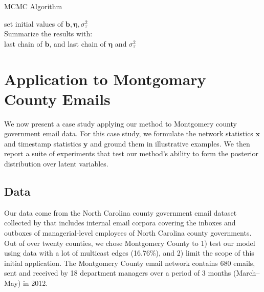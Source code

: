 \documentclass[12pt]{article}
\begin{document}
 \begin{algorithm}[H]
 	\SetAlgoLined
 	\caption{MCMC Algorithm}
 	set initial values of $\boldsymbol{b}, \boldsymbol{\eta}, \sigma_\tau^2$\\
 	Summarize the results with: \\last chain of $\boldsymbol{b}$, and last chain of $\boldsymbol{\eta}$ and $\sigma_\tau^2$ 
 				\label{alg:MCMC}
 \end{algorithm}
 	   \section{Application to Montgomary County Emails}\label{subsec:Emails}
 	  We now present a case study applying our method to Montgomery county government email data. For this case study,
 	  we formulate the network statistics $\boldsymbol{x}$ and timestamp statistics $\boldsymbol{y}$ and ground them in illustrative examples. We then report a suite of experiments that test our method’s ability to form the posterior distribution over latent variables. 
 	  	   \subsection{Data}\label{subsec:Montgomery}
 	   Our data come from the North Carolina county government email dataset collected by \cite{ben2017transparency} that includes internal email corpora covering the inboxes and outboxes of managerial-level employees of North Carolina county governments. Out of over twenty counties, we chose Montgomery County to 1) test our model using data with a lot of multicast edges (16.76\%), and 2) limit the scope of this initial application. The Montgomery County email network contains 680 emails, sent and received by 18 department managers over a period of 3 months (March--May) in 2012. 
\end{document}
